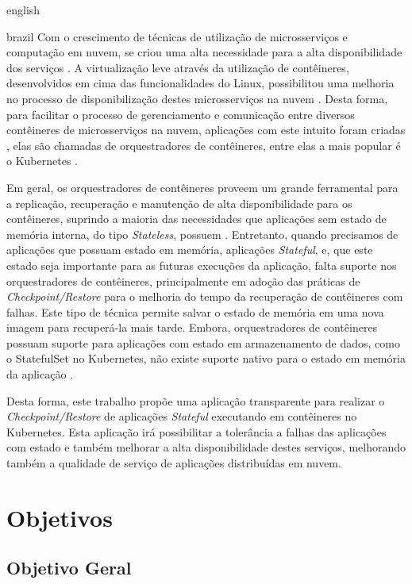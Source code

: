 \begin{otherlanguage*}{english}
\begin{otherlanguage*}{brazil}
Com o crescimento de técnicas de utilização de microsserviços e computação em
nuvem, se criou uma alta necessidade para a alta disponibilidade dos serviços
\cite{vayghan2021kubernetes}. A virtualização leve através da utilização de
contêineres, desenvolvidos em cima das funcionalidades do Linux, possibilitou
uma melhoria no processo de disponibilização destes microsserviços na nuvem
\cite{laadan2010linux}. Desta forma, para facilitar o processo de gerenciamento
e comunicação entre diversos contêineres de microsserviços na nuvem, aplicações
com este intuito foram criadas \cite{vayghan2021kubernetes}, elas são chamadas
de orquestradores de contêineres, entre elas a mais popular é o Kubernetes
\cite{kubernetes}.

Em geral, os orquestradores de contêineres proveem um grande ferramental para a
replicação, recuperação e manutenção de alta disponibilidade para os contêineres,
suprindo a maioria das necessidades que aplicações sem estado de memória interna,
do tipo \textit{Stateless}, possuem \cite{vayghan2021kubernetes}. Entretanto,
quando precisamos de aplicações que possuam estado em memória, aplicações
\textit{Stateful}, e, que este estado seja importante para as futuras execuções
da aplicação, falta suporte nos orquestradores de contêineres, principalmente em
adoção das práticas de \textit{Checkpoint/Restore} \cite{muller2022architecture}
para o melhoria do tempo da recuperação de contêineres com falhas. Este tipo de
técnica permite salvar o estado de memória em uma nova imagem para recuperá-la
mais tarde. Embora, orquestradores de contêineres possuam suporte para aplicações
com estado em armazenamento de dados, como o StatefulSet no Kubernetes, não existe
suporte nativo para o estado em memória da aplicação \cite{tran2022proactive}.

Desta forma, este trabalho propõe uma aplicação transparente para realizar o
\textit{Checkpoint/Restore} de aplicações \textit{Stateful} executando em
contêineres no Kubernetes. Esta aplicação irá possibilitar a tolerância a falhas
das aplicações com estado e também melhorar a alta disponibilidade destes serviços,
melhorando também a qualidade de serviço de aplicações distribuídas em nuvem.

\section{Objetivos}

\subsection{Objetivo Geral}


\end{otherlanguage*}
\end{otherlanguage*}
